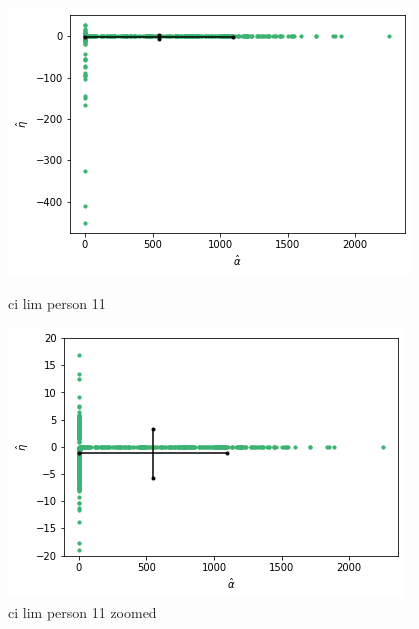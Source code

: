 \begin{figure}
    \centering
    \begin{minipage}{0.48\textwidth}
        \centering
        \includegraphics[scale=0.37]{pictures/ci_lim_a_e_person11.png}
        \caption{ci lim person 11}
        \label{fig:ci_lim_a_e_person_11}
    \end{minipage}\hfill
    \begin{minipage}{0.48\textwidth}
        \centering
        \includegraphics[scale=0.37]{pictures/ci_lim_a_e_person11_zoomed.png}
        \caption{ci lim person 11 zoomed}
        \label{fig:ci_lim_a_e_person_11_zoomed}
    \end{minipage}
\end{figure}


